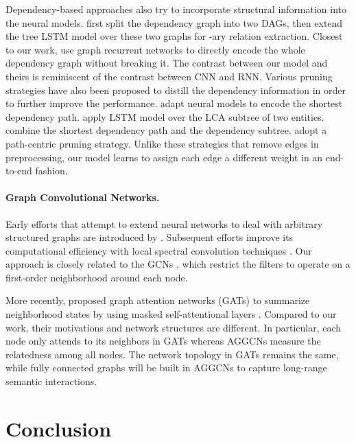 \documentclass[11pt,a4paper]{article}
\begin{document}
Dependency-based approaches also try to incorporate structural information into the neural models. \citet{Peng2017CrossSentenceNR} first split the dependency graph into two DAGs, then extend the tree LSTM model \citep{Tai2015ImprovedSR} over these two graphs for -ary relation extraction. Closest to our work, \citet{Song2018NaryRE} use graph recurrent networks \citep{Song2018AGM} to directly encode the whole dependency graph without breaking it. The contrast between our model and theirs is reminiscent of the contrast between CNN and RNN. Various pruning strategies have also been proposed to distill the dependency information in order to further improve the performance. \citet{Xu2015SemanticRC,Xu2015ClassifyingRV} adapt neural models to encode the shortest dependency path. \citet{Miwa2016EndtoEndRE} apply LSTM model over the LCA subtree of two entities. \citet{Liu2015ADN} combine the shortest dependency path and the dependency subtree. \citet{Zhang2018GraphCO} adopt a path-centric pruning strategy. Unlike these strategies that remove edges in preprocessing, our model learns to assign each edge a different weight in an end-to-end fashion.

\paragraph{Graph Convolutional Networks.} Early efforts that attempt to extend neural networks to deal with arbitrary structured graphs are introduced by \citet{Gori2005ANM, Bruna2014SpectralNA}. Subsequent efforts improve its computational efficiency with local spectral convolution techniques \citep{Henaff2015DeepCN, Defferrard2016ConvolutionalNN}. Our approach is closely related to the GCNs \citep{Kipf2016SemiSupervisedCW}, which restrict the filters to operate on a first-order neighborhood around each node. 



More recently, \citet{Velickovic2017GraphAN} proposed graph attention networks (GATs) to summarize neighborhood states by using masked self-attentional layers \citep{Vaswani2017AttentionIA}. Compared to our work, their motivations and network structures are different. In particular, each node only attends to its neighbors in GATs whereas AGGCNs measure the relatedness among all nodes. The network topology in GATs remains the same, while fully connected graphs will be built in AGGCNs to capture long-range semantic interactions.



\section{Conclusion}
\end{document}
